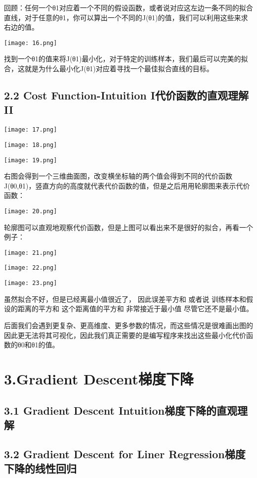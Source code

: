 \documentclass{article}
\begin{document}
\begin{CJK}{UTF8}{gbsn}
回顾：任何一个θ1对应着一个不同的假设函数，或者说对应这左边一条不同的拟合直线，对于任意的θ1，你可以算出一个不同的J(θ1)的值，我们可以利用这些来求右边的值。

\texttt{[image: 16.png]}

找到一个θ1的值来将J(θ1)最小化，对于特定的训练样本，我们最后可以完美的拟合，这就是为什么最小化J(θ1)对应着寻找一个最佳拟合直线的目标。
\subsection*{2.2 Cost Function-Intuition I代价函数的直观理解 II}

\texttt{[image: 17.png]}

\texttt{[image: 18.png]}

\texttt{[image: 19.png]}

右图会得到一个三维曲面图，改变横坐标轴的两个值会得到不同的代价函数J(θ0,θ1)，竖直方向的高度就代表代价函数的值，但是之后用用轮廓图来表示代价函数：

\texttt{[image: 20.png]}

轮廓图可以直观地观察代价函数，但是上图可以看出来不是很好的拟合，再看一个例子：

\texttt{[image: 21.png]}

\texttt{[image: 22.png]}

\texttt{[image: 23.png]}

虽然拟合不好，但是已经离最小值很近了， 因此误差平方和 或者说 训练样本和假设的距离的平方和 这个距离值的平方和 非常接近于最小值 尽管它还不是最小值。

后面我们会遇到更复杂、更高维度、更多参数的情况，而这些情况是很难画出图的 因此更无法将其可视化，因此我们真正需要的是编写程序来找出这些最小化代价函数的θ0和θ1的值。

\section*{3.Gradient Descent梯度下降}
\subsection*{3.1 Gradient Descent Intuition梯度下降的直观理解}
\subsection*{3.2 Gradient Descent for Liner Regression梯度下降的线性回归}


\end{CJK}
\end{document}
